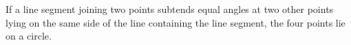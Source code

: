 
If a line segment joining two points subtends equal angles at two other points lying on the same side of the line containing the line segment, the four points lie on a circle.
